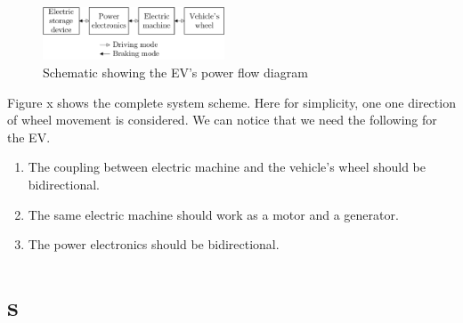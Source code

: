 \documentclass[journal]{IEEEtran}
\begin{document}
\begin{figure}
	\centering
	\includegraphics[width=0.48\textwidth]{combining-driving-n-braking-modes}
	\caption{Schematic showing the EV's power flow diagram}
	\label{Fig:combining-driving-n-braking-modes}
\end{figure}
Figure x shows the complete system scheme. Here for simplicity, one one direction of wheel movement is considered. We can notice that we need the following for the EV.
\begin{tcolorbox}[colback=blue!0!white,colframe=blue!75!black,title=Conditions]
\begin{enumerate}
  \item The coupling between electric machine and the vehicle's wheel should be bidirectional.
  \item The same electric machine should work as a motor and a generator.
  \item The power electronics should be bidirectional.
\end{enumerate}
\end{tcolorbox}

\section{s}



\end{document}
